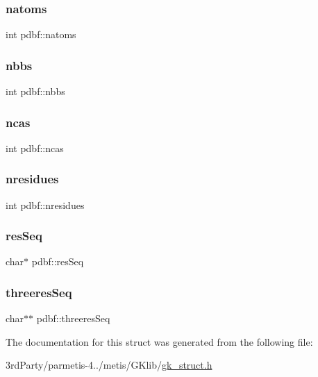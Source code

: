 \mbox{\label{structpdbf_a6752def7d72ee73480a9fad514e60aef}} 
\subsubsection{\texorpdfstring{natoms}{natoms}}
{\footnotesize\ttfamily int pdbf\+::natoms}

\mbox{\label{structpdbf_a9d9dbad94b94f067e3ab58334c9e892f}} 
\subsubsection{\texorpdfstring{nbbs}{nbbs}}
{\footnotesize\ttfamily int pdbf\+::nbbs}

\mbox{\label{structpdbf_a7d28e61b01058ba61fb34b7b4b50e044}} 
\subsubsection{\texorpdfstring{ncas}{ncas}}
{\footnotesize\ttfamily int pdbf\+::ncas}

\mbox{\label{structpdbf_a4172474fbba5b2127ab8e3184c63a059}} 
\subsubsection{\texorpdfstring{nresidues}{nresidues}}
{\footnotesize\ttfamily int pdbf\+::nresidues}

\mbox{\label{structpdbf_a6be2fde75925c5a1064dfecd700dc79f}} 
\subsubsection{\texorpdfstring{res\+Seq}{resSeq}}
{\footnotesize\ttfamily char$\ast$ pdbf\+::res\+Seq}

\mbox{\label{structpdbf_a2d79aa1e5f0634b5e4ceb22d1b2f2462}} 
\subsubsection{\texorpdfstring{threeres\+Seq}{threeresSeq}}
{\footnotesize\ttfamily char$\ast$$\ast$ pdbf\+::threeres\+Seq}



The documentation for this struct was generated from the following file\+:\begin{DoxyCompactItemize}
\item 
3rd\+Party/parmetis-\/4../metis/\+G\+Klib/\hyperlink{gk__struct_8h}{gk\+\_\+struct.\+h}\end{DoxyCompactItemize}
